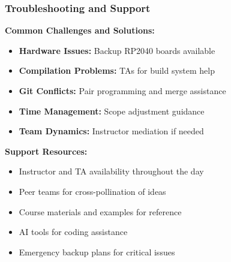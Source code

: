 \documentclass{beamer}
\begin{document}
\begin{frame}
\frametitle{Troubleshooting and Support}
\textbf{Common Challenges and Solutions:}
\begin{itemize}
    \item \textbf{Hardware Issues:} Backup RP2040 boards available
    \item \textbf{Compilation Problems:} TAs for build system help
    \item \textbf{Git Conflicts:} Pair programming and merge assistance
    \item \textbf{Time Management:} Scope adjustment guidance
    \item \textbf{Team Dynamics:} Instructor mediation if needed
\end{itemize}

\vspace{0.5cm}
\textbf{Support Resources:}
\begin{itemize}
    \item Instructor and TA availability throughout the day
    \item Peer teams for cross-pollination of ideas
    \item Course materials and examples for reference
    \item AI tools for coding assistance
    \item Emergency backup plans for critical issues
\end{itemize}
\end{frame}
\end{document}

